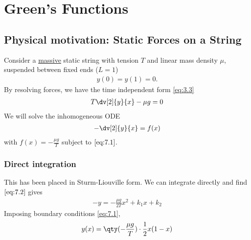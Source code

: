 \section{Green's Functions}

\subsection{Physical motivation: Static Forces on a String}
Consider a \underline{massive} static string with tension $T$ and linear mass density $\mu$, suspended between fixed ends ($L = 1$)
\begin{align} \label{eq:7.1}
    y(0) = y(1) = 0.
\end{align}
By resolving forces, we have the time independent form \cref{eq:3.3}
\begin{align*}
	T \dv[2]{y}{x} - \mu g = 0
\end{align*}
We will solve the inhomogeneous ODE 
\begin{align} \label{eq:7.2}
    - \dv[2]{y}{x} = f(x)
\end{align} with $f(x) = -\frac{\mu g}{T}$ subject to $\cref{eq:7.1}$.

\subsubsection{Direct integration}
This has been placed in Sturm-Liouville form.
We can integrate directly and find $\cref{eq:7.2}$ gives
\begin{align*}
	-y = -\frac{\mu g}{2T} x^2 + k_1 x + k_2
\end{align*}
Imposing boundary conditions \cref{eq:7.1},
\begin{align} \label{eq:7.3}
	y(x) = \qty(-\frac{\mu g}{T}) \cdot \frac{1}{2}x(1-x)
\end{align}

